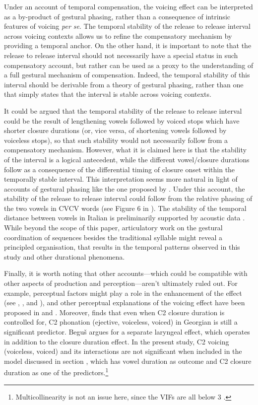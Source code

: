 \documentclass[charis]{glossa}
\begin{document}
Under an account of temporal compensation, the voicing effect can be
interpreted as a by-product of gestural phasing, rather than a
consequence of intrinsic features of voicing \emph{per se}. The temporal
stability of the release to release interval across voicing contexts
allows us to refine the compensatory mechanism by providing a temporal
anchor. On the other hand, it is important to note that the release to
release interval should not necessarily have a special status in such
compensatory account, but rather can be used as a proxy to the
understanding of a full gestural mechanism of compensation. Indeed, the
temporal stability of this interval should be derivable from a theory of
gestural phasing, rather than one that simply states that the interval
is stable across voicing contexts.

It could be argued that the temporal stability of the release to release
interval could be the result of lengthening vowels followed by voiced
stops which have shorter closure durations (or, vice versa, of
shortening vowels followed by voiceless stops), so that such stability
would not necessarily follow from a compensatory mechanism. However,
what it is claimed here is that the stability of the interval is a
logical antecedent, while the different vowel/closure durations follow
as a consequence of the differential timing of closure onset within the
temporally stable interval. This interpretation seems more natural in
light of accounts of gestural phasing like the one proposed by
\citet{tilsen2013}. Under this account, the stability of the release to
release interval could follow from the relative phasing of the two
vowels in CVCV words (see Figure 6 in \citealt{tilsen2013}). The
stability of the temporal distance between vowels in Italian is
preliminarily supported by acoustic data \citet{celata2014}. While
beyond the scope of this paper, articulatory work on the gestural
coordination of sequences besides the traditional syllable might reveal
a principled organisation, that results in the temporal patterns
observed in this study and other durational phenomena.

Finally, it is worth noting that other accounts---which could be
compatible with other aspects of production and perception---aren't
ultimately ruled out. For example, perceptual factors might play a role
in the enhancement of the effect (see \citealt{kingston1994},
\citealt{port1982}, and \citealt{luce1985}), and other perceptual
explanations of the voicing effect have been proposed in
\citet{javkin1976} and \citet{kluender1988}. Moreover, \citet{begus2017}
finds that even when C2 closure duration is controlled for, C2 phonation
(ejective, voiceless, voiced) in Georgian is still a significant
predictor. Beguš argues for a separate laryngeal effect, which operates
in addition to the closure duration effect. In the present study, C2
voicing (voiceless, voiced) and its interactions are not significant
when included in the model discussed in section ,
which has vowel duration as outcome and C2 closure duration as one of
the
predictors.\footnote{Multicollinearity is not an issue here, since the VIFs are all below 3 \citep{zuur2010}.}
\end{document}
